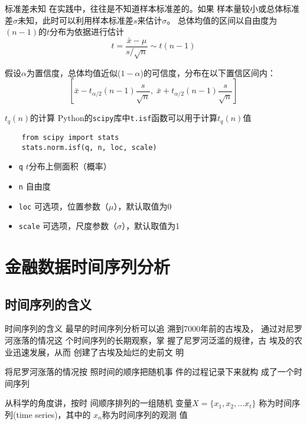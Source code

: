 \documentclass[t]{beamer}
\begin{document}
\begin{frame}[fragile]{标准差未知}
在实践中，往往是不知道样本标准差的。如果 样本量较小或总体标准差$\sigma$未知，此时可以利用样本标准差$s$来估计$\sigma$。
总体均值的区间以自由度为$(n-1)$的$t$分布为依据进行估计
\[t=\frac{\bar x-\mu}{s/\sqrt{n}}\sim t(n-1)\]

假设$\alpha$为置信度，总体均值近似($1-\alpha$)的可信度，分布在以下置信区间内：
\[\left[\bar x-t_{\alpha/2}(n-1)\frac{s}{\sqrt{n}},\; \bar x+t_{\alpha/2}(n-1)\frac{s}{\sqrt{n}}\right]\]
\end{frame}


\begin{frame}[fragile]{$t_q(n)$的计算}
Python的\verb|scipy|库中\verb|t.isf|函数可以用于计算$t_q(n)$值
\begin{lstlisting}
    from scipy import stats
    stats.norm.isf(q, n, loc, scale)
\end{lstlisting}
\begin{itemize}
    \item \verb|q| $t$分布上侧面积（概率）
    \item \verb|n| 自由度
    \item \verb|loc| 可选项，位置参数（$\mu$），默认取值为0
    \item \verb|scale| 可选项，尺度参数（$\sigma$），默认取值为1
\end{itemize}
\end{frame}

\section{金融数据时间序列分析}
\subsection{时间序列的含义}
\begin{frame}[fragile]{时间序列的含义}
最早的时间序列分析可以追
溯到7000年前的古埃及，
通过对尼罗河涨落的情况这
个时间序列的长期观察，掌
握了尼罗河泛滥的规律，古
埃及的农业迅速发展，从而
创建了古埃及灿烂的史前文
明

将尼罗河涨落的情况按
照时间的顺序把随机事
件的过程记录下来就构
成了一个时间序列

从科学的角度讲，按时
间顺序排列的一组随机
变量$X = \{x_1 , x_2,\ldots x_t\}$
称为时间序列(time series)，其中的
$𝑥_n$称为时间序列的观测
值
\end{frame}
\end{document}
